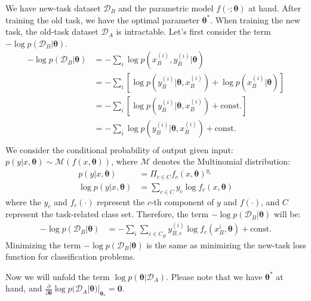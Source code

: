 \documentclass{article}
\begin{document}
We have new-task dataset $\mathcal D_B$ and the parametric model $f(\cdot; \boldsymbol{\theta})$ at hand.
After training the old task, we have the optimal parameter $\boldsymbol{\theta^*}$.
When training the new task,
the old-task dataset $\mathcal D_A$ is intractable.
Let's first consider the term $- \log p(\mathcal D_B | \boldsymbol{\theta})$.
\begin{equation}
\begin{split}
    - \log p(\mathcal D_B | \boldsymbol{\theta}) &=
    - \sum_i \log p(x_B^{(i)}, y_B^{(i)}| \boldsymbol{\theta}) \\
    &= - \sum_i [\log p(y_B^{(i)}| \boldsymbol{\theta}, x_B^{(i)})
    + \log p(x_B^{(i)}| \boldsymbol{\theta})]\\
    &= - \sum_i [\log p(y_B^{(i)}| \boldsymbol{\theta}, x_B^{(i)})
    + \text{const.}] \\
    &= - \sum_i \log p(y_B^{(i)}| \boldsymbol{\theta}, x_B^{(i)})
    + \text{const.} \\
\end{split}
\end{equation}
We consider the conditional probability of output given input:
$p(y|x, \boldsymbol{\theta}) \sim \mathcal{M}(f(x, \boldsymbol{\theta}))$,
where $\mathcal M$ denotes the Multinomial distribution:
\begin{equation}
\begin{split}
p(y|x, \boldsymbol{\theta}) &= \Pi_{c\in C}f_c(x, \boldsymbol{\theta})^{y_c} \\
\log p(y|x, \boldsymbol{\theta})  &= \sum_{c\in C} y_c \log f_c(x, \boldsymbol{\theta})
\label{eq:multinomial_likelihood_cls}
\end{split}
\end{equation}
where the $y_c$ and $f_c(\cdot)$ represent the $c$-th component of $y$ and $f(\cdot)$,
and $C$ represent the task-related class set.
Therefore, the term $- \log p(\mathcal D_B | \boldsymbol{\theta})$ will be:
\begin{equation}
\begin{split}
- \log p(\mathcal D_B | \boldsymbol{\theta}) &= 
- \sum_i \sum_{c\in C_B} y_{B,c}^{(i)} \log f_c(x_{B}^{i}, \boldsymbol{\theta}) + \text{const.}
\end{split}
\end{equation}
Minimizing the term $- \log p(\mathcal D_B | \boldsymbol{\theta})$
is the same as minimizing the new-task loss function for classification problems.

Now we will unfold the term $\log p(\boldsymbol{\theta}|\mathcal D_A)$.
Please note that we have $\boldsymbol{\theta^*}$ at hand,
and $\frac{\partial}{\partial \boldsymbol{\theta}}
\log p(\mathcal D_A|\boldsymbol{\theta})|_{\boldsymbol{\theta_*}} = \boldsymbol{0}$.
\end{document}
